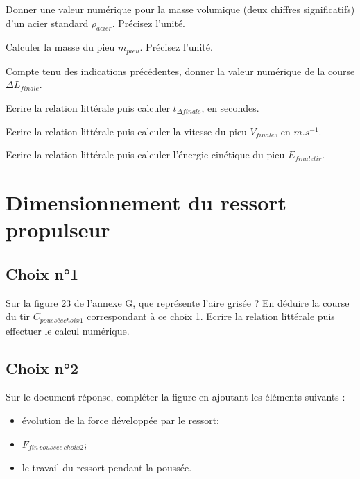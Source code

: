 \documentclass[11pt]{article}
\begin{document}
\UPSTIquestion Donner une valeur numérique pour la masse volumique (deux chiffres significatifs) d'un acier standard $\rho_{acier}$. Précisez l'unité. 
\begin{UPSTIcorrige}
\end{UPSTIcorrige}

\UPSTIquestion Calculer la masse du pieu $m_{pieu}$. Précisez l'unité. 
\begin{UPSTIcorrige}
\end{UPSTIcorrige}


\UPSTIquestion Compte tenu des indications précédentes, donner la valeur numérique de la course $\Delta L_{finale}$. 
\begin{UPSTIcorrige}
\end{UPSTIcorrige}

\UPSTIquestion Ecrire la relation littérale puis calculer $t_{\Delta finale}$, en secondes.
\begin{UPSTIcorrige}
\end{UPSTIcorrige}

\UPSTIquestion Ecrire la relation littérale puis calculer la vitesse du pieu $V_{finale}$, en $\si{m.s^{-1}}$.
\begin{UPSTIcorrige}
\end{UPSTIcorrige}

\UPSTIquestion Ecrire la relation littérale puis calculer l'énergie cinétique du pieu $E_{finale tir}$. 
\begin{UPSTIcorrige}
\end{UPSTIcorrige}

\section{Dimensionnement du ressort propulseur}
\subsection*{Choix n°1}
\UPSTIquestion* Sur la figure 23 de l'annexe G, que représente l'aire grisée ?
En déduire la course du tir $C_{poussée choix 1}$ correspondant à ce choix 1. Ecrire la relation littérale puis effectuer le calcul numérique. 
\begin{UPSTIcorrige}
\end{UPSTIcorrige}


\subsection*{Choix n°2}
\UPSTIquestion* Sur le document réponse, compléter la figure en ajoutant les éléments suivants : 
\begin{itemize}
\item évolution de la force développée par le ressort;
\item $F_{fin\, poussee\, choix 2}$;
\item le travail du ressort pendant la poussée.
\end{itemize}
\begin{UPSTIcorrige}
\end{UPSTIcorrige}
\end{document}
